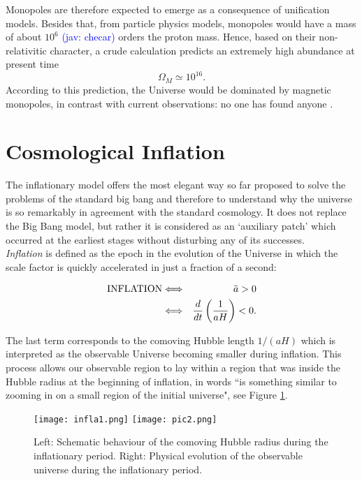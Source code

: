 \documentclass{rmaa}
\def\bea{\begin{eqnarray}}
\def\eea{\end{eqnarray}}
\newcommand{\jav}[1]{\textcolor{blue}{(jav: #1)}}
\begin{document}
\noindent
Monopoles are therefore expected to emerge as a consequence of unification models. 
Besides that, from particle physics models, monopoles would have a mass of about $10^6$ \jav{checar}
orders the proton mass. Hence, based on their non-relativitic character, 
a crude calculation predicts an extremely high abundance at present time \citep{Coles}
$$
\Omega_M \simeq 10^{16}.
$$
%
According to this prediction, the Universe would be dominated by magnetic monopoles,
in contrast with current observations: no one has found anyone \citep{Ambrosio02}. 
\\


\section{Cosmological Inflation}
\vskip 6pt

The inflationary model offers the most elegant way so far proposed to solve the problems
of the standard big bang and therefore to understand why the universe is so remarkably in agreement 
with the standard cosmology. It does not replace the Big Bang model, but rather it is considered 
as an `auxiliary patch' which occurred at the earliest stages without disturbing any of its successes.
\\

\textit{Inflation} is defined as the epoch in the evolution of the Universe in which the scale factor 
is quickly accelerated in just a fraction of a second:

\bea \label{eq:inflation}
{\rm INFLATION} &\Longleftrightarrow&~~\ddot a>0 \\
&\Longleftrightarrow& \frac{d}{dt}\left( \frac{{1}}{aH}\right)<0. \label{eq:inflation2}
\eea

\noindent
The last term corresponds to the comoving Hubble length 
$1/(aH)$ which is interpreted as the observable 
Universe becoming smaller during inflation. This process allows our observable
region to lay within a region that was inside the Hubble radius at the beginning of inflation, 
in \citet{Liddle2} words ``is something
similar to zooming in on a small region of the initial universe", see
Figure \ref{fig:Liddle}.
\\

\begin{figure}[ht] 
\texttt{[image: infla1.png]}
\texttt{[image: pic2.png]}
\caption{Left: Schematic behaviour 
of the comoving Hubble radius during the inflationary period. Right: 
Physical evolution of the observable universe during the inflationary period.}%
\label{fig:Liddle}
\end{figure}
\end{document}
